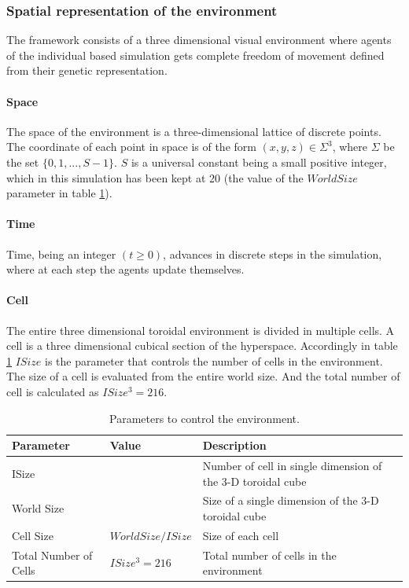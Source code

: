 \documentclass[letterpaper]{article}
\numberwithin{equation}{section}
\begin{document}
\subsubsection{Spatial representation of the environment}
The framework consists of a three dimensional visual environment where agents of the individual based simulation gets complete freedom of movement defined from their genetic representation. 

\paragraph{Space}
The space of the environment is a three-dimensional lattice of discrete points. The coordinate of each point in space is of the form \((x,y,z) \in \Sigma^3\), where \(\Sigma\) be the set \(\{0, 1, ..., S-1\}\). \(S\) is a universal constant being a small positive integer, which in this simulation has been kept at 20 (the value of the \(World Size\) parameter in table \ref{tab:environment-control-parameters}). 

\paragraph{Time}
Time, being an integer \( (t \geq 0) \), advances in discrete steps in the simulation, where at each step the agents update themselves. 

\paragraph{Cell}
The entire three dimensional toroidal environment is divided in multiple cells. A cell is a three dimensional cubical section of the hyperspace. Accordingly in table \ref{tab:environment-control-parameters} \(ISize\) is the parameter that controls the number of cells in the environment. The size of a cell is evaluated from the entire world size. And the total number of cell is calculated as \(ISize^3 = 216\).

\begin{table}[H]
\centering
\begin{tabular}{| p{2.2cm} | >{\centering} p{3cm} | p{7.5cm} |}
	\hline
		\textbf{Parameter} & \textbf{Value} & \textbf{Description} \\ \hline
		ISize & 6 & Number of cell in single dimension of the 3-D toroidal cube\\ \hline
		World Size & 20 & Size of a single dimension of the 3-D toroidal cube\\ \hline
		Cell Size & \( World Size / ISize \) & Size of each cell\\ \hline
		Total Number of Cells & \( ISize^3  = 216\) & Total number of cells in the environment\\ 
	\hline
\end{tabular}
\caption{Parameters to control the environment.}
\label{tab:environment-control-parameters}
\end{table}
\end{document}
